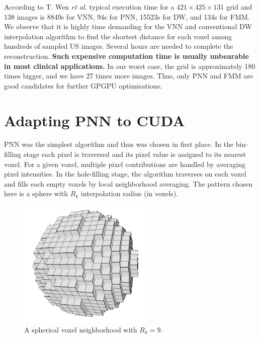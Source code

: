 \documentclass[12pt,journal,compsoc]{IEEEtran}
\begin{document}
According to T. Wen \textit{et al.}\textbf{\cite{2}} typical execution time for a $421\times425\times131$ grid and 138 images is 8849s for VNN, 94s for PNN, 15523s for DW, and 134s for FMM.
We observe that it is highly time demanding for the VNN and conventional DW interpolation algorithm to find the shortest distance for each voxel among hundreds of sampled US images. Several hours are needed to complete the reconstruction. \textbf{Such expensive computation time is usually unbearable in most clinical applications.} In our worst case, the grid is approximately 180 times bigger, and we have 27 times more images. Thus, only PNN and FMM are good candidates for further GPGPU optimisations.

\section{Adapting PNN to CUDA}

PNN was the simplest algorithm and thus was chosen in first place. 
In the bin-filling stage each pixel is traversed and its pixel value is assigned to its nearest voxel. 
For a given voxel, multiple pixel contributions are handled by averaging pixel intensities.  
In the hole-filling stage, the algorithm traverses on each voxel and fills each empty voxels by local neighborhood averaging. The pattern chosen here is a sphere with $R_k$ interpolation radius (in voxels). 


\begin{figure}[ht!]
\centering
\includegraphics[width=2.5in]{neighborhood}
\caption{A spherical voxel neighborhood with $R_k=9$.}
\label{neighborhood}
\end{figure}
\end{document}
